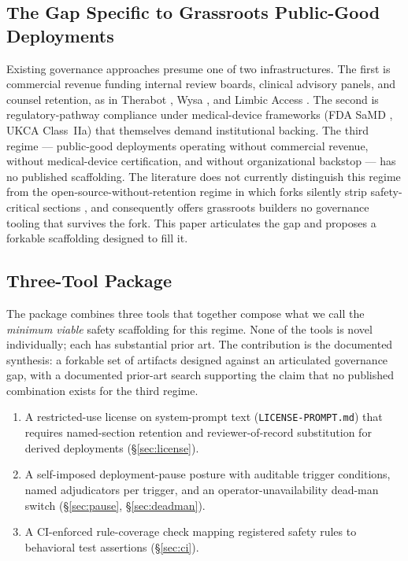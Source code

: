 \documentclass[letterpaper]{article} %
\begin{document}
\subsection{The Gap Specific to Grassroots Public-Good Deployments}

Existing governance approaches presume one of two infrastructures. The first is commercial revenue funding internal review boards, clinical advisory panels, and counsel retention, as in Therabot \citep{heinz2025therabot}, Wysa \citep{inkster2018wysa}, and Limbic Access \citep{habicht2024limbic}. The second is regulatory-pathway compliance under medical-device frameworks (FDA SaMD \citep{fda2017samd}, UKCA Class~IIa) that themselves demand institutional backing. The third regime --- public-good deployments operating without commercial revenue, without medical-device certification, and without organizational backstop --- has no published scaffolding. The literature does not currently distinguish this regime from the open-source-without-retention regime in which forks silently strip safety-critical sections \citep{aiid2023neda}, and consequently offers grassroots builders no governance tooling that survives the fork. This paper articulates the gap and proposes a forkable scaffolding designed to fill it.

\subsection{Three-Tool Package}

The package combines three tools that together compose what we call the \emph{minimum viable} safety scaffolding for this regime. None of the tools is novel individually; each has substantial prior art. The contribution is the documented synthesis: a forkable set of artifacts designed against an articulated governance gap, with a documented prior-art search supporting the claim that no published combination exists for the third regime.

\begin{enumerate}
\item A restricted-use license on system-prompt text (\texttt{LICENSE-PROMPT.md}) that requires named-section retention and reviewer-of-record substitution for derived deployments (\S\ref{sec:license}).
\item A self-imposed deployment-pause posture with auditable trigger conditions, named adjudicators per trigger, and an operator-unavailability dead-man switch (\S\ref{sec:pause}, \S\ref{sec:deadman}).
\item A CI-enforced rule-coverage check mapping registered safety rules to behavioral test assertions (\S\ref{sec:ci}).
\end{enumerate}
\end{document}
